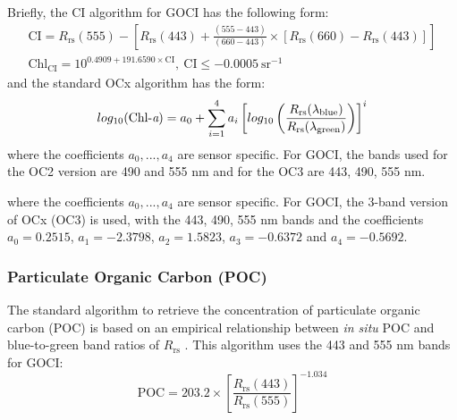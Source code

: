 \documentclass[remotesensing,article,submit,moreauthors,pdftex,10pt,a4paper]{Definitions/mdpi}
\begin{document}
Briefly, the CI algorithm for GOCI has the following form: 
\begin{equation}
\begin{split}
  \text{CI}=R_\text{rs}(555)-\left[R_\text{rs}(443)+\frac{(555-443)}{(660-443)}\times [R_\text{rs}(660)-R_\text{rs}(443)]\right]\\
  \text{Chl}_{\text{CI}} = 10^{0.4909+191.6590\times \text{CI}},~\text{CI}\leq-0.0005~\text{sr}^{-1}
\end{split}  
\end{equation}
\noindent and the standard OCx algorithm has the form: 
\begin{equation}
  log_{10}(\text{Chl-{\it a}}) = a_0 + \sum_{i=1}^4 a_i \left[log_{10}\left(\frac{R_\text{rs}(\lambda_\text{blue})}{R_\text{rs}(\lambda_\text{green})}\right)\right]^i
\end{equation}
where the coefficients $a_0,...,a_4$ are sensor specific. For GOCI, the bands used for the OC2 version are 490 and 555 nm and for the OC3 are 443, 490, 555 nm.

where the coefficients $a_0,...,a_4$ are sensor specific. For GOCI, the 3-band version of OCx (OC3) is used, with the 443, 490, 555 nm bands and the coefficients $a_0=0.2515$, $a_1=-2.3798$, $a_2=1.5823$, $a_3=-0.6372$ and $a_4=-0.5692$. 
\subsubsection{Particulate Organic Carbon (POC)}
The standard algorithm to retrieve the concentration of particulate organic carbon (POC) is based on an empirical relationship between {\it in situ} POC and blue-to-green band ratios of $R_\text{rs}$ \cite{Stramski2008}. This algorithm uses the 443 and 555 nm bands for GOCI:
\begin{equation}
  \text{POC} = 203.2\times \left[\frac{R_\text{rs}(443)}{R_\text{rs}(555)} \right]^{-1.034}
\end{equation}
\end{document}
